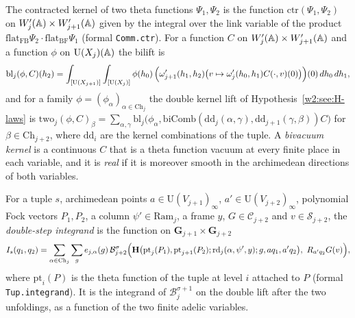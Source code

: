 The contracted kernel of two theta functions $\Psi_1,\Psi_2$ is the function $\mathrm{ctr}(\Psi_1,\Psi_2)$ on $W'_j(\mathbb A)\times W'_{j+1}(\mathbb A)$ given by the integral over the link variable of the product $\mathrm{flat}_{\mathrm{FB}}\Psi_2\cdot\mathrm{flat}_{\mathrm{BF}}\Psi_1$ (formal \texttt{Comm.ctr}). For a function $C$ on $W'_j(\mathbb A)\times W'_{j+1}(\mathbb A)$ and a function $\phi$ on $\mathrm U(X_j)(\mathbb A)$ the bilift is
\[
\mathrm{bl}_j(\phi,C)(h_2)=\int_{[\mathrm U(X_{j+1})]}\int_{[\mathrm U(X_j)]}\phi(h_0)\,\Bigl(\omega'_{j+1}(h_1,h_2)\bigl(v\mapsto\omega'_j(h_0,h_1)C(\cdot,v)(0)\bigr)\Bigr)(0)\,dh_0\,dh_1,
\]
and for a family $\phi=(\phi_\alpha)_{\alpha\in\mathrm{Ch}_j}$ the double kernel lift of Hypothesis~\ref{w2:see:H-laws} is $\mathrm{two}_j(\phi,C)_\beta=\sum_{\alpha,\gamma}\mathrm{bl}_j\bigl(\phi_\alpha,\mathrm{biComb}(\mathrm{dd}_j(\alpha,\gamma),\mathrm{dd}_{j+1}(\gamma,\beta))C\bigr)$ for $\beta\in\mathrm{Ch}_{j+2}$, where $\mathrm{dd}_i$ are the kernel combinations of the tuple. A \emph{bivacuum kernel} is a continuous $C$ that is a theta function vacuum at every finite place in each variable, and it is \emph{real} if it is moreover smooth in the archimedean directions of both variables.

For a tuple $s$, archimedean points $a\in\mathrm U(V_{j+1})_\infty$, $a'\in\mathrm U(V_{j+2})_\infty$, polynomial Fock vectors $P_1,P_2$, a column $\psi'\in\mathrm{Ram}_j$, a frame $y$, $G\in\mathcal C_{j+2}$ and $v\in\mathcal S_{j+2}$, the \emph{double-step integrand} is the function on $\mathbf G_{j+1}\times\mathbf G_{j+2}$
\begin{equation}\label{w3s:integrand}
I_s(q_1,q_2)=\sum_{\alpha\in\mathrm{Ch}_j}\sum_ge_{j,\alpha}(g)\,\mathcal B^\sigma_{j+2}\Bigl(\mathbf H\bigl(\mathrm{pt}_j(P_1),\mathrm{pt}_{j+1}(P_2);\mathrm{rd}_j(\alpha,\psi',y);g,aq_1,a'q_2\bigr),\ R_{a'q_2}G(v)\Bigr),
\end{equation}
where $\mathrm{pt}_i(P)$ is the theta function of the tuple at level $i$ attached to $P$ (formal \texttt{Tup.integrand}). It is the integrand of $\mathcal B^{\sigma+1}_j$ on the double lift after the two unfoldings, as a function of the two finite adelic variables.

